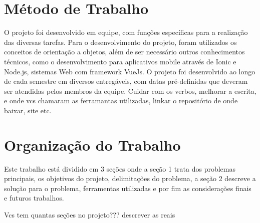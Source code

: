 \section{Método de Trabalho}
O projeto foi desenvolvido em equipe, com funções específicas para a realização das diversas tarefas. Para o desenvolvimento do projeto, foram utilizados os conceitos de orientação a objetos, além de ser necessário outros conhecimentos técnicos, como o desenvolvimento para aplicativos mobile através de Ionic e Node.js, sistemas Web com framework VueJs. O projeto foi desenvolvido ao longo de cada semestre em diversos entregáveis, com datas pré-definidas que deveram ser atendidas pelos membros da equipe.
{\color{red} Cuidar com os verbos, melhorar a escrita, e onde vcs chamaram as ferramantas utilizadas, linkar  o repositório de onde baixar, site etc.}

\section{Organização do Trabalho}
Este trabalho está dividido em  3 seções onde a seção 1 trata  dos problemas principais, os objetivos do projeto, delimitações do problema, a seção 2 descreve a solução para o problema, ferramentas utilizadas e por fim as considerações finais e futuros trabalhos.

{\color{red} Vcs tem quantas seções no projeto??? descrever as reais}